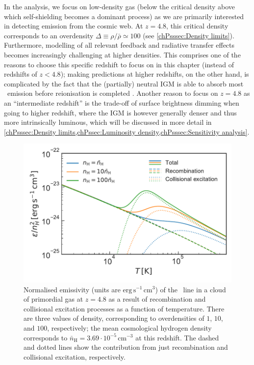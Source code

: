 In the analysis, we focus on low-density gas (below the critical density above which self-shielding becomes a dominant process) as we are primarily interested in detecting emission from the cosmic web. At $z=4.8$, this critical density corresponds to an overdensity $\Delta \equiv \rho/\bar{\rho} \simeq 100$ (see \cref{chPsssec:Density limits}). Furthermore, modelling of all relevant feedback and radiative transfer effects becomes increasingly challenging at higher densities. This comprises one of the reasons to choose this specific redshift to focus on in this chapter (instead of redshifts of $z < 4.8$); making predictions at higher redshifts, on the other hand, is complicated by the fact that the (partially) neutral IGM is able to absorb most \lya\ emission before reionisation is completed \citep[$z \gtrsim 5$; e.g.][]{2022MNRAS.514...55B}. Another reason to focus on $z = 4.8$ as an ``intermediate redshift'' is the trade-off of surface brightness dimming when going to higher redshift, where the IGM is however generally denser and thus more intrinsically luminous, which will be discussed in more detail in \cref{chPsssec:Density limits,chPssec:Luminosity density,chPsssec:Sensitivity analysis}.
\begin{figure}
    \centering
    \includegraphics[width=0.6\linewidth]{"Plots/ChapterP/Theoretical_emissivity"}
    \caption[Theoretical \lya\ emissivity as a function of temperature]
    {Normalised emissivity (units are $\mathrm{erg \, s^{-1} \, cm^3}$) of the \lya\ line in a cloud of primordial gas at $z=4.8$ as a result of recombination and collisional excitation processes as a function of temperature. There are three values of density, corresponding to overdensities of $1$, $10$, and $100$, respectively; the mean cosmological hydrogen density corresponds to $\bar{n}_\text{H} = 3.69 \cdot 10^{-5} \, \mathrm{cm^{-3}}$ at this redshift. The dashed and dotted lines show the contribution from just recombination and collisional excitation, respectively.}
    \label{chPfig:Emissivity theoretical}
\end{figure}

